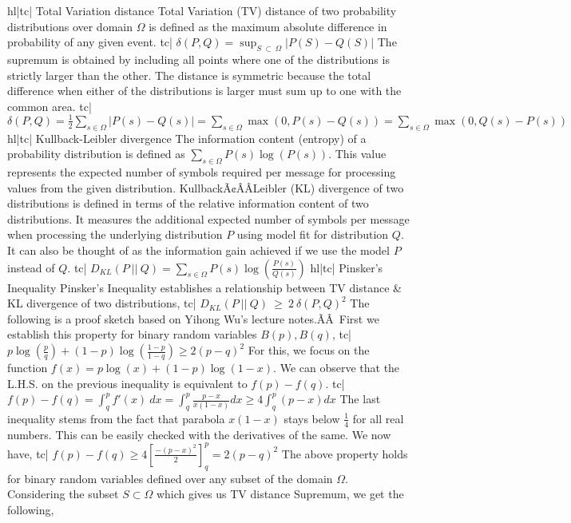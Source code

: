 hl|tc| Total Variation distance
Total Variation (TV) distance of two probability distributions over domain \(\Omega\) is defined as the maximum absolute difference in probability of any given event.
tc| \( \delta(P, Q) = \sup_{S \ \subset \ \Omega} | P(S) - Q(S) | \)
The supremum is obtained by including all points where one of the distributions is strictly larger than the other. The distance is symmetric because the total difference when either of the distributions is larger must sum up to one with the common area.
tc| \( \delta(P, Q) = \frac{1}{2} \sum_{s \in \Omega} |P(s) - Q(s)| = \sum_{s \in \Omega} \max(0, P(s) - Q(s)) = \sum_{s \in \Omega} \max(0, Q(s) - P(s)) \)
hl|tc| Kullback-Leibler divergence
The information content (entropy) of a probability distribution is defined as \( \sum_{s \in \Omega} P(s) \log(P(s)) \). This value represents the expected number of symbols required per message for processing values from the given distribution.
KullbackÃ¢ÂÂLeibler (KL) divergence of two distributions is defined in terms of the relative information content of two distributions. It measures the additional expected number of symbols per message when processing the underlying distribution \(P\) using model fit for distribution \(Q\). It can also be thought of as the information gain achieved if we use the model \(P\) instead of \(Q\).
tc| \( D_{KL} (P \ || \ Q) = \sum_{s \in \Omega} P(s) \log \left(\frac{P(s)}{Q(s)}\right) \)
hl|tc| Pinsker's Inequality
Pinsker's Inequality establishes a relationship between TV distance & KL divergence of two distributions,
tc| \( D_{KL} (P \ || \ Q) \ \ge \ 2 \ \delta(P, Q)^2 \)
The following is a proof sketch based on Yihong Wu's lecture notes.ÃÂ First we establish this property for binary random variables \( B(p), B(q) \),
tc| \( p \log{ \left( \frac{p}{q} \right) } + (1-p) \log{ \left( \frac{1-p}{1-q} \right) \ge 2(p-q)^2 } \)
For this, we focus on the function \( f(x) = p \log (x) + (1 - p) \log (1 - x) \). We can observe that the L.H.S. on the previous inequality is equivalent to \( f(p) - f(q) \).
tc| \( f(p) - f(q) = \int_q^p f'(x) \ dx = \int_q^p \frac{p - x}{x (1 - x)} dx \ge 4 \int_q^p (p - x) dx \)
The last inequality stems from the fact that parabola \( x (1-x) \) stays below \( \frac{1}{4} \) for all real numbers. This can be easily checked with the derivatives of the same. We now have,
tc| \( f(p) - f(q) \ge 4 \left[ \frac{-(p-x)^2}{2} \right]_q^p = 2 (p - q)^2 \)
The above property holds for binary random variables defined over any subset of the domain \( \Omega \). Considering the subset \( S \subset \Omega \) which gives us TV distance Supremum, we get the following,
